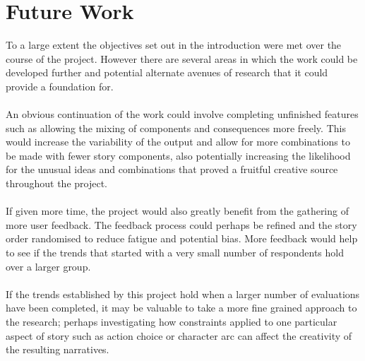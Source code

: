 \documentclass[letterpaper]{article}
\begin{document}
\section{Future Work}
To a large extent the objectives set out in the introduction were met over the course of the project. However there are several areas in which the work could be developed further and potential alternate avenues of research that it could provide a foundation for.\\
\\An obvious continuation of the work could involve completing unfinished features such as allowing the mixing of components and consequences more freely. This would increase the variability of the output and allow for more combinations to be made with fewer story components, also potentially increasing the likelihood for the unusual ideas and combinations that proved a fruitful creative source throughout the project.\\
\\If given more time, the project would also greatly benefit from the gathering of more user feedback. The feedback process could perhaps be refined and the story order randomised to reduce fatigue and potential bias. More feedback would help to see if the trends that started with a very small number of respondents hold over a larger group.\\
\\If the trends established by this project hold when a larger number of evaluations have been completed, it may be valuable to take a more fine grained approach to the research; perhaps investigating how constraints applied to one particular aspect of story such as action choice or character arc can affect the creativity of the resulting narratives.\\

\end{document}
